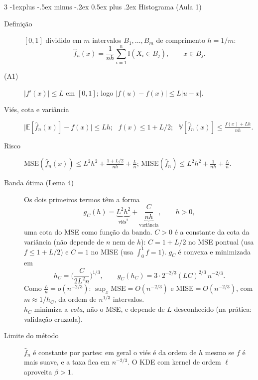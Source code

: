 \documentclass[10pt,landscape]{article}
\makeatletter
\newcommand{\E}{\mathbb{E}}
\newcommand{\V}{\mathbb{V}}
\newcommand{\I}{\mathbb{I}}
\newcommand{\MSE}{\textrm{MSE}}
\renewcommand{\subsection}{\@startsection{subsection}{2}{0mm}%
                                {-1explus -.5ex minus -.2ex}%
                                {0.5ex plus .2ex}%
                                {\normalfont\footnotesize\bfseries}}
\makeatother
\begin{document}
\begin{multicols}{3}
\subsection{Histograma (Aula 1)}
\begin{description}
  \item[Definição] $[0,1]$ dividido em $m$ intervalos $B_1,\dots,B_m$ de comprimento $h=1/m$:
  \[\hat f_n(x)=\frac1{nh}\sum_{i=1}^n\I(X_i\in B_j),\qquad x\in B_j.\]
  \item[(A1)] $|f'(x)|\le L$ em $[0,1]$; logo $|f(u)-f(x)|\le L|u-x|$.
  \item[Viés, cota e variância] $\big|\E[\hat f_n(x)]-f(x)\big|\le Lh$; \ $f(x)\le1+L/2$; \ $\V[\hat f_n(x)]\le\frac{f(x)+Lh}{nh}$.
  \item[Risco] $\MSE(\hat f_n(x))\le L^2h^2+\frac{1+L/2}{nh}+\frac Ln$; \quad $\textrm{MISE}(\hat f_n)\le L^2h^2+\frac1{nh}+\frac Ln$.
  \item[Banda ótima (Lema 4)] Os dois primeiros termos têm a forma
  \[g_C(h)=\underbrace{L^2h^2}_{\text{viés}^2}+\underbrace{\frac{C}{nh}}_{\text{variância}},\qquad h>0,\]
  uma cota do MSE como função da banda. $C>0$ é a constante da cota da variância (não depende de $n$ nem de $h$): $C=1+L/2$ no MSE pontual (usa $f\le1+L/2$) e $C=1$ no MISE (usa $\int_0^1f=1$). $g_C$ é convexa e minimizada em
  \[h_C=\Big(\frac{C}{2L^2n}\Big)^{1/3},\qquad g_C(h_C)=3\cdot2^{-2/3}(LC)^{2/3}\,n^{-2/3}.\]
  Como $\frac Ln=o(n^{-2/3})$: $\sup_x\MSE=O(n^{-2/3})$ e $\textrm{MISE}=O(n^{-2/3})$, com $m\approx1/h_C$, da ordem de $n^{1/3}$ intervalos. \\
  $h_C$ minimiza a \emph{cota}, não o MSE, e depende de $L$ desconhecido (na prática: validação cruzada).
  \item[Limite do método] $\hat f_n$ é constante por partes: em geral o viés é da ordem de $h$ mesmo se $f$ é mais suave, e a taxa fica em $n^{-2/3}$. O KDE com kernel de ordem $\ell$ aproveita $\beta>1$.
\end{description}


\end{multicols}
\end{document}
